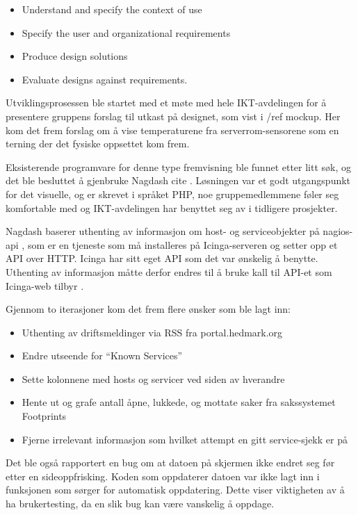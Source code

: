 \begin{itemize}
	\item Understand and specify the context of use
	\item Specify the user and organizational requirements
	\item Produce design solutions
	\item Evaluate designs against requirements.
\end{itemize}

Utviklingsprosessen ble startet med et møte med hele IKT-avdelingen for å presentere gruppens forslag til utkast på designet, som vist i  /ref mockup. Her kom det frem forslag om å vise temperaturene fra serverrom-sensorene som en terning der det fysiske oppsettet kom frem.

Eksisterende programvare for denne type fremvisning ble funnet etter litt søk, og det ble besluttet å gjenbruke Nagdash cite \cite{nagdash}. Løsningen var et godt utgangspunkt for det visuelle, og er skrevet i språket PHP, noe gruppemedlemmene føler seg komfortable med og IKT-avdelingen har benyttet seg av i tidligere prosjekter. 

Nagdash baserer uthenting av informasjon om host- og serviceobjekter på nagios-api \cite{nagiosapi}, som er en tjeneste som må installeres på Icinga-serveren og setter opp et API over HTTP. Icinga har sitt eget API som det var ønskelig å benytte. Uthenting av informasjon måtte derfor endres til å bruke kall til API-et som Icinga-web tilbyr \cite{icingarestapi}.

Gjennom to iterasjoner kom det frem flere ønsker som ble lagt inn:
\begin{itemize}
	 \item Uthenting av driftsmeldinger via RSS fra portal.hedmark.org
	 \item Endre utseende for “Known Services”
	 \item Sette kolonnene med hosts og servicer ved siden av hverandre 
	 \item Hente ut og grafe antall åpne, lukkede, og mottate saker fra sakssystemet Footprints
	 \item Fjerne irrelevant informasjon som hvilket attempt en gitt service-sjekk er på
\end{itemize}

Det ble også rapportert en bug om at datoen på skjermen ikke endret seg før etter en sideoppfrisking. Koden som oppdaterer datoen var ikke lagt inn i funksjonen som sørger for automatisk oppdatering. Dette viser viktigheten av å ha brukertesting, da en slik bug kan være vanskelig å oppdage.

